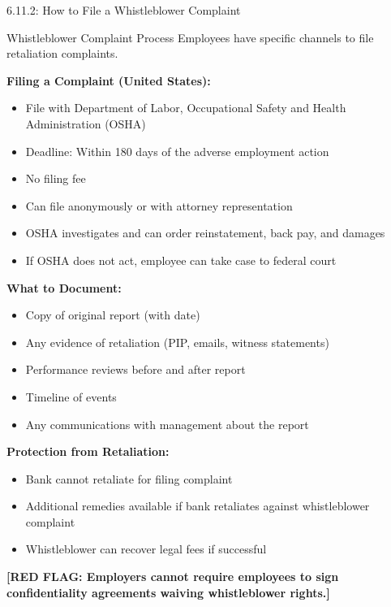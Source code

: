 \documentclass[11pt,a4paper]{beamer}
\newcommand{\redflag}[1]{\textcolor{red!80!black}{\textbf{[RED FLAG: #1]}}}
\begin{document}
\begin{frame}{6.11.2: How to File a Whistleblower Complaint}
	\begin{block}{Whistleblower Complaint Process}
		Employees have specific channels to file retaliation complaints.
	\end{block}
	\textbf{Filing a Complaint (United States):}
	\begin{itemize}
		\item File with Department of Labor, Occupational Safety and Health Administration (OSHA)
		\item Deadline: Within 180 days of the adverse employment action
		\item No filing fee
		\item Can file anonymously or with attorney representation
		\item OSHA investigates and can order reinstatement, back pay, and damages
		\item If OSHA does not act, employee can take case to federal court
	\end{itemize}
	\textbf{What to Document:}
	\begin{itemize}
		\item Copy of original report (with date)
		\item Any evidence of retaliation (PIP, emails, witness statements)
		\item Performance reviews before and after report
		\item Timeline of events
		\item Any communications with management about the report
	\end{itemize}
	\textbf{Protection from Retaliation:}
	\begin{itemize}
		\item Bank cannot retaliate for filing complaint
		\item Additional remedies available if bank retaliates against whistleblower complaint
		\item Whistleblower can recover legal fees if successful
	\end{itemize}
	\redflag{Employers cannot require employees to sign confidentiality agreements waiving whistleblower rights.}
\end{frame}

\end{document}
